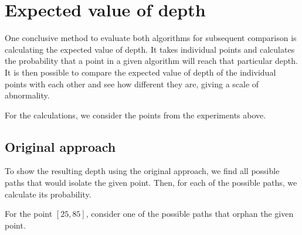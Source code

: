 \section{Expected value of depth}
One conclusive method to evaluate both algorithms for subsequent comparison is calculating the expected value of depth. It takes individual points and calculates the probability that a point in a given algorithm will reach that particular depth. It is then possible to compare the expected value of depth of the individual points with each other and see how different they are, giving a scale of abnormality.

For the calculations, we consider the points from the experiments above.

\subsection{Original approach}
To show the resulting depth using the original approach, we find all possible paths that would isolate the given point. Then, for each of the possible paths, we calculate its probability.




For the point $[25,85]$, consider one of the possible paths that orphan the given point.

